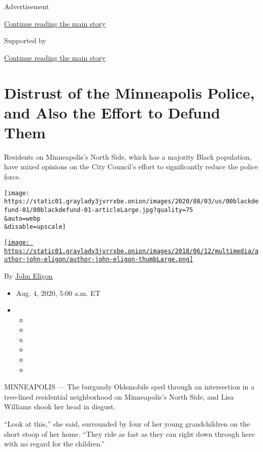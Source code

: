 Advertisement

\protect\hyperlink{after-top}{Continue reading the main story}

Supported by

\protect\hyperlink{after-sponsor}{Continue reading the main story}

\hypertarget{distrust-of-the-minneapolis-police-and-also-the-effort-to-defund-them}{%
\section{Distrust of the Minneapolis Police, and Also the Effort to
Defund
Them}\label{distrust-of-the-minneapolis-police-and-also-the-effort-to-defund-them}}

Residents on Minneapolis's North Side, which has a majority Black
population, have mixed opinions on the City Council's effort to
significantly reduce the police force.

\texttt{[image: https://static01.graylady3jvrrxbe.onion/images/2020/08/03/us/00blackdefund-01/00blackdefund-01-articleLarge.jpg?quality=75\\\&auto=webp\\\&disable=upscale]}

\href{https://www.nytimes3xbfgragh.onion/by/john-eligon}{\texttt{[image: https://static01.graylady3jvrrxbe.onion/images/2018/06/12/multimedia/author-john-eligon/author-john-eligon-thumbLarge.png]}}

By \href{https://www.nytimes3xbfgragh.onion/by/john-eligon}{John Eligon}

\begin{itemize}
\item
  Aug. 4, 2020, 5:00 a.m. ET
\item
  \begin{itemize}
  \item
  \item
  \item
  \item
  \item
  \item
  \end{itemize}
\end{itemize}

MINNEAPOLIS --- The burgundy Oldsmobile sped through an intersection in
a tree-lined residential neighborhood on Minneapolis's North Side, and
Lisa Williams shook her head in disgust.

``Look at this,'' she said, surrounded by four of her young
grandchildren on the short stoop of her home. ``They ride as fast as
they can right down through here with no regard for the children.''

